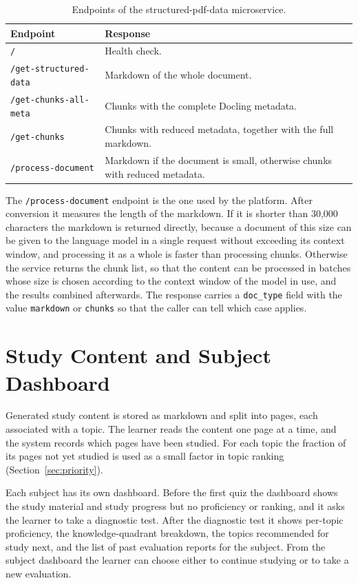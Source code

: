 \documentclass[12pt,a4paper,oneside]{report}
\begin{document}
\begin{table}[H]
\centering
\caption{Endpoints of the structured-pdf-data microservice.}
\label{tab:endpoints}
\begin{tabularx}{\textwidth}{@{}lX@{}}
\toprule
\textbf{Endpoint} & \textbf{Response} \\
\midrule
\texttt{/} & Health check. \\
\texttt{/get-structured-data} & Markdown of the whole document. \\
\texttt{/get-chunks-all-meta} & Chunks with the complete Docling metadata. \\
\texttt{/get-chunks} & Chunks with reduced metadata, together with the full markdown. \\
\texttt{/process-document} & Markdown if the document is small, otherwise chunks with reduced metadata. \\
\bottomrule
\end{tabularx}
\end{table}

The \texttt{/process-document} endpoint is the one used by the platform.
After conversion it measures the length of the markdown. If it is shorter
than 30{,}000 characters the markdown is returned directly, because a
document of this size can be given to the language model in a single
request without exceeding its context window, and processing it as a
whole is faster than processing chunks. Otherwise the service returns the
chunk list, so that the content can be processed in batches whose size is
chosen according to the context window of the model in use, and the
results combined afterwards. The response carries a \texttt{doc\_type}
field with the value \texttt{markdown} or \texttt{chunks} so that the
caller can tell which case applies.

\section{Study Content and Subject Dashboard}

Generated study content is stored as markdown and split into pages, each
associated with a topic. The learner reads the content one page at a time,
and the system records which pages have been studied. For each topic the
fraction of its pages not yet studied is used as a small factor in topic
ranking (Section~\ref{sec:priority}).

Each subject has its own dashboard. Before the first quiz the dashboard
shows the study material and study progress but no proficiency or
ranking, and it asks the learner to take a diagnostic test. After the
diagnostic test it shows per-topic proficiency, the knowledge-quadrant
breakdown, the topics recommended for study next, and the list of past
evaluation reports for the subject. From the subject dashboard the learner
can choose either to continue studying or to take a new evaluation.
\end{document}
